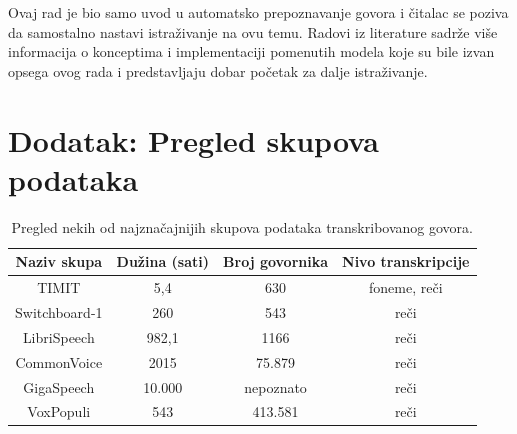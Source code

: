 \documentclass[a4paper]{article}
\begin{document}
Ovaj rad je bio samo uvod u automatsko prepoznavanje govora i čitalac se poziva da samostalno nastavi istraživanje na ovu temu.
Radovi iz literature sadrže više informacija o konceptima i implementaciji pomenutih modela koje su bile izvan opsega ovog rada i predstavljaju dobar početak za dalje istraživanje.

\appendix
 
% 


\appendix

\section{Dodatak: Pregled skupova podataka}
\label{sec:skupovi}

\begin{table}[h!]
\begin{center}
  \caption{Pregled nekih od najznačajnijih skupova podataka transkribovanog govora.}
  \begin{tabular}{|c|c|c|c|}
    \hline
    Naziv skupa   & Dužina (sati) & Broj govornika & Nivo transkripcije \\
    \hline
    TIMIT         & 5,4           & 630            & foneme, reči       \\ 
    Switchboard-1 & 260           & 543            & reči               \\ 
    LibriSpeech   & 982,1         & 1166           & reči               \\ 
    CommonVoice   & 2015          & 75.879         & reči               \\
    GigaSpeech    & 10.000        & nepoznato      & reči               \\
    VoxPopuli     & 543           & 413.581        & reči               \\
    \hline
  \end{tabular}
\end{center}
\end{table}
\end{document}
